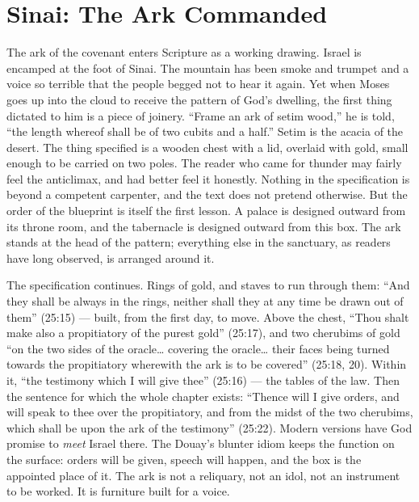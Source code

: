 \sectionguard
\section{Sinai: The Ark Commanded}

The ark of the covenant enters Scripture as a working drawing. Israel is
encamped at the foot of Sinai. The mountain has been smoke and trumpet and a
voice so terrible that the people begged not to hear it again. Yet when
Moses goes up into the cloud to receive the pattern of God's dwelling, the
first thing dictated to him is a piece of joinery. ``Frame an ark of setim
wood,'' he is told, ``the length whereof shall be of two cubits and a
half.'' Setim is the acacia of the desert. The thing specified is a wooden
chest with a lid, overlaid with gold, small enough to be carried on two
poles. The reader who came for thunder may fairly feel the anticlimax, and
had better feel it honestly. Nothing in the specification is beyond a
competent carpenter, and the text does not pretend otherwise. But the order
of the blueprint is itself the first lesson. A palace is designed outward
from its throne room, and the tabernacle is designed outward from this box.
The ark stands at the head of the pattern; everything else in the sanctuary,
as readers have long observed, is arranged around it.

The specification continues. Rings of gold, and staves to run through them:
``And they shall be always in the rings, neither shall they at any time be
drawn out of them'' (25:15) --- built, from the first day, to move. Above
the chest, ``Thou shalt make also a propitiatory of the purest gold''
(25:17), and two cherubims of gold ``on the two sides of the
oracle\ldots{} covering the oracle\ldots{} their faces being turned towards
the propitiatory wherewith the ark is to be covered'' (25:18, 20). Within
it, ``the testimony which I will give thee'' (25:16) --- the tables of the
law. Then the sentence for which the whole chapter exists: ``Thence will
I give orders, and will speak to thee over the propitiatory, and from the
midst of the two cherubims, which shall be upon the ark of the testimony''
(25:22). Modern versions have God promise to \emph{meet} Israel there. The
Douay's blunter idiom keeps the function on the surface: orders will be
given, speech will happen, and the box is the appointed place of it. The ark
is not a reliquary, not an idol, not an instrument to be worked. It is
furniture built for a voice.


